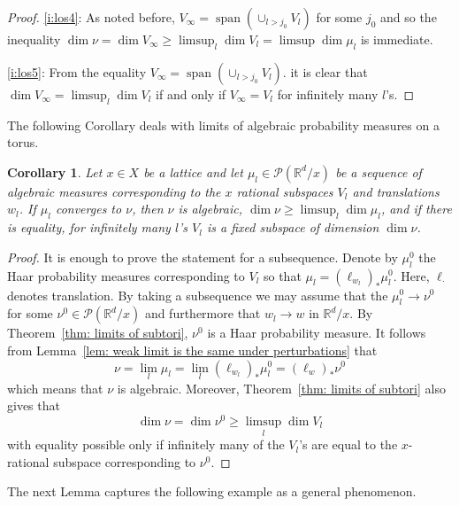 \documentclass[reqno,11pt, twoside]{amsart}
\theoremstyle{plain}
\newtheorem{cor}[thm]{Corollary}
\theoremstyle{definition}
\theoremstyle{definition}
\theoremstyle{remark}
\numberwithin{equation}{section}
\newcommand{\ignore}[1]{{}}
\newcommand{\cP}{\mathcal{P}}
\newcommand{\bR}{\mathbb{R}}
\newcommand\pa[1]{\left(#1\right)}
\newcommand\on[1]{\operatorname{#1}}
\begin{document}
\begin{proof}
\eqref{i:los4}: As noted before, $V_\infty = \on{span}\pa{\cup_{l>j_0} V_l}$ for some $j_0$ and so the inequality $\dim \nu = \dim V_\infty \ge \limsup_l \dim V_l = \limsup \dim \mu_l$ is immediate. 

\eqref{i:los5}: From the equality 
$V_\infty=  \on{span}\pa{\cup_{l>j_0} V_l}$.
it is clear that $\dim V_\infty = \limsup_l\dim V_l$ if and only if $V_\infty = V_l$ for infinitely many $l$'s. 
\end{proof}
The following Corollary deals with limits of algebraic probability measures on a torus.
\begin{cor}
    \label{cor: limit of algebraic measures is algebraic}
    Let $x\in X$ be a lattice and let 
    $\mu_l\in \cP(\bR^d/x)$ be a sequence of algebraic measures corresponding to the $x$ rational subspaces $V_l$ and translations $w_l$. 
    If $\mu_l$ converges to $\nu$, then $\nu$ is algebraic, $\dim \nu\ge\limsup_l\dim \mu_l$, and if there is equality, for infinitely many $l$'s $V_l$ is a fixed subspace of dimension $\dim\nu$.
    \ignore{
    then $\lim_l \mu_l^0 =\nu^0$ exists and  there exists $w\in \bR^d/x$ such that $\nu  = (l_w)_*\nu^0$. Moreover $\nu$ is algebraic.
    }
\end{cor}
\begin{proof}
    It is enough to prove the statement for a subsequence.
    Denote by $\mu_l^0$ the Haar probability measures corresponding to $V_l$
    so that $\mu_l = (\ell_{w_l})_*\mu_l^0$. Here, $\ell_\cdot$ denotes translation.
    By taking a subsequence we may assume that the $\mu_l^0\to\nu^0$ for some 
    $\nu^0\in \cP(\bR^d/x)$ and furthermore that $w_l\to w$ in $\bR^d/x$.
    By Theorem~\ref{thm: limits of subtori}, $\nu^0$ is a Haar probability measure. 
    It follows from Lemma~\ref{lem: weak limit is the same under perturbations} that 
    $$\nu = \lim_l\mu_l = \lim_l(\ell_{w_l})_*\mu_l^0 = (\ell_w)_*\nu^0 $$
    which means that $\nu$ is algebraic. Moreover, Theorem~\ref{thm: limits of subtori} also gives that 
    $$\dim \nu = \dim \nu^0 \ge \limsup_l\dim V_l$$
    with equality possible only if infinitely many of the $V_l$'s are equal to the $x$-rational subspace corresponding to $\nu^0$.
\end{proof}
The next Lemma captures the following example as a general phenomenon.
\end{document}
